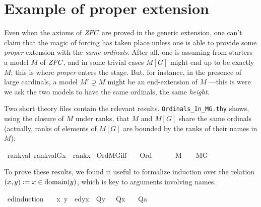 \section{Example of proper extension}
\label{sec:example-proper-extension}

Even when the axioms of $\mathit{ZFC}$ are proved in the generic extension,
one can't claim that the magic of forcing has taken place unless one
is able to provide some \emph{proper} extension with the \emph{same
ordinals}. After all, one is assuming from starters a model $M$ of $\mathit{ZFC}$,
and in some trivial cases $M[G]$ might end up to be exactly $M$; this
is where \emph{proper} enters the stage. But, for instance, in the
presence of large cardinals, a model $M'\supsetneq M$ might be an
end-extension of $M$ ---this is were we ask the two models to have the
same ordinals, the same \emph{height}. 

Two short theory files contain the relevant
results. \verb|Ordinals_In_MG.thy| shows, using the closure of $M$
under ranks, that $M$ and $M[G]$ share the same ordinals (actually,
ranks of elements of $M[G]$ are bounded by the ranks of their names in
$M$):
\begin{isabelle}
\isamarkupfalse%
\ rank{\isacharunderscore}val{\isacharcolon}\ {\isachardoublequoteopen}rank{\isacharparenleft}val{\isacharparenleft}G{\isacharcomma}x{\isacharparenright}{\isacharparenright}\ {\isasymle}\ rank{\isacharparenleft}x{\isacharparenright}{\isachardoublequoteclose}\isanewline
{}\isamarkupfalse%
\ Ord{\isacharunderscore}MG{\isacharunderscore}iff{\isacharcolon}\isanewline
\ \ \ {\isachardoublequoteopen}Ord{\isacharparenleft}{\isasymalpha}{\isacharparenright}{\isachardoublequoteclose}\ \isanewline
\ \ \ {\isachardoublequoteopen}{\isasymalpha}\ {\isasymin}\ M\ {\isasymlongleftrightarrow}\ {\isasymalpha}\ {\isasymin}\ M{\isacharbrackleft}G{\isacharbrackright}{\isachardoublequoteclose}
\end{isabelle}

To prove these results, we found it useful to formalize induction over
the relation $(x,y) \mathrel{\mathop:}= x\in\operatorname{domain}(y)$, which is key
to arguments involving names.
\begin{isabelle}
\isamarkupfalse%
\ ed{\isacharunderscore}induction{\isacharcolon}\isanewline
\ \ \ {\isachardoublequoteopen}{\isasymAnd}x{\isachardot}\ {\isasymlbrakk}{\isasymAnd}y{\isachardot}\ \ ed{\isacharparenleft}y{\isacharcomma}x{\isacharparenright}\ {\isasymLongrightarrow}\ Q{\isacharparenleft}y{\isacharparenright}\ {\isasymrbrakk}\ {\isasymLongrightarrow}\ Q{\isacharparenleft}x{\isacharparenright}{\isachardoublequoteclose}\isanewline
\ \ \ {\isachardoublequoteopen}Q{\isacharparenleft}a{\isacharparenright}{\isachardoublequoteclose}
\end{isabelle}

